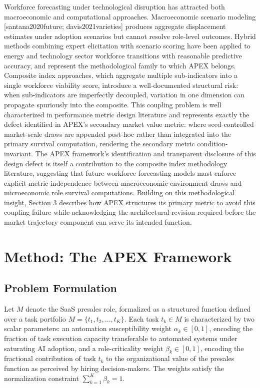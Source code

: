 \documentclass[10pt, conference]{IEEEtran}
\begin{document}
Workforce forecasting under technological disruption has attracted both macroeconomic and computational approaches. Macroeconomic scenario modeling [santana2020future; davis2021varieties] produces aggregate displacement estimates under adoption scenarios but cannot resolve role-level outcomes. Hybrid methods combining expert elicitation with scenario scoring \cite{wiser2021expert} have been applied to energy and technology sector workforce transitions with reasonable predictive accuracy, and represent the methodological family to which APEX belongs. Composite index approaches, which aggregate multiple sub-indicators into a single workforce viability score, introduce a well-documented structural risk: when sub-indicators are imperfectly decoupled, variation in one dimension can propagate spuriously into the composite. This coupling problem is well characterized in performance metric design literature \cite{virtanen2020scipy} and represents exactly the defect identified in APEX's secondary market value metric: where seed-controlled market-scale draws are appended post-hoc rather than integrated into the primary survival computation, rendering the secondary metric condition-invariant. The APEX framework's identification and transparent disclosure of this design defect is itself a contribution to the composite index methodology literature, suggesting that future workforce forecasting models must enforce explicit metric independence between macroeconomic environment draws and microeconomic role survival computations. Building on this methodological insight, Section 3 describes how APEX structures its primary metric to avoid this coupling failure while acknowledging the architectural revision required before the market trajectory component can serve its intended function.

\section{Method: The APEX Framework}

\label{sec:method_the_apex_framework}

\subsection{Problem Formulation}

\label{sec:problem_formulation}

Let $M$ denote the SaaS presales role, formalized as a structured function defined over a task portfolio $M = \{t_1, t_2, \ldots, t_K\}$. Each task $t_k \in M$ is characterized by two scalar parameters: an automation susceptibility weight $\alpha_k \in [0,1]$, encoding the fraction of task execution capacity transferable to automated systems under saturating AI adoption, and a role-criticality weight $\beta_k \in [0,1]$, encoding the fractional contribution of task $t_k$ to the organizational value of the presales function as perceived by hiring decision-makers. The weights satisfy the normalization constraint $\sum_{k=1}^{K} \beta_k = 1$.
\end{document}
